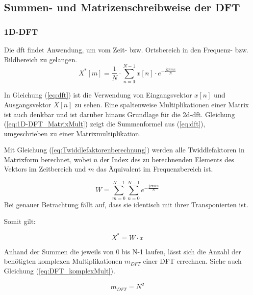 \subsection{Summen- und Matrizenschreibweise der DFT}\label{sec:SummenMatrizenDFT}
\subsubsection{1D-DFT}
Die \gls{dft} findet Anwendung, um vom Zeit- bzw. Ortsbereich in den Frequenz- bzw. Bildbereich zu gelangen.
\begin{equation}\label{eq:dft}
 X^* \left[ m \right] = \frac{1}{N} \cdot \sum^{N-1}_{n=0} x[n] \cdot e^{-\frac{j 2 \pi m n}{N}}
\end{equation}


In Gleichung (\ref{eq:dft}) ist die Verwendung von Eingangsvektor $x[n]$ und Ausgangsvektor $X[n]$ zu sehen. Eine spaltenweise Multiplikationen einer Matrix
ist auch denkbar und ist darüber hinaus Grundlage für die \gls{2d-dft}.
Gleichung (\ref{eq:1D-DFT_MatrixMult}) zeigt die Summenformel aus (\ref{eq:dft}), umgeschrieben zu einer Matrixmultiplikation.

Mit Gleichung (\ref{eq:Twiddlefaktorenberechnung}) werden alle Twiddlefaktoren in Matrixform berechnet, wobei $n$ der Index des zu berechnenden Elements des 
Vektors im Zeitbereich und $m$ das Äquivalent im Frequenzbereich ist.

\begin{equation}\label{eq:Twiddlefaktorenberechnung}
W = \sum^{N-1 }_{m=0} \sum^{N-1 }_{n=0} e^{-\frac{j 2 \pi m n}{N}}
\end{equation}
Bei genauer Betrachtung fällt auf, dass sie identisch mit ihrer Transponierten ist.


Somit gilt:

\begin{equation}\label{eq:1D-DFT_MatrixMult}
X^* = W \cdot x
\end{equation}




Anhand der Summen die jeweils von 0 bis N-1 laufen, lässt sich die Anzahl der benötigten komplexen Multiplikationen $m_{DFT}$ einer DFT errechnen. Siehe auch Gleichung 
(\ref{eq:DFT_komplexMult}).

\begin{equation}\label{eq:DFT_komplexMult}
 m_{DFT} = N^2
\end{equation}


